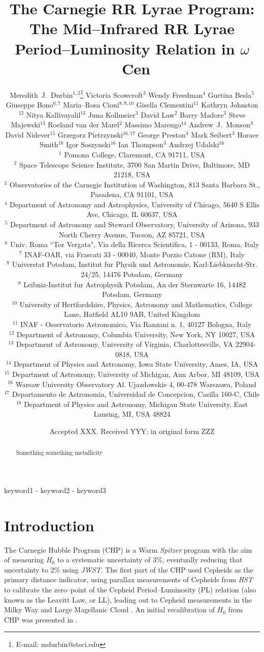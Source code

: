 \documentclass[a4paper,fleqn,usenatbib]{mnras}
\title[Mid--IR RR Lyrae PL Relation in $\omega$ Cen]{The Carnegie RR Lyrae Program: The Mid--Infrared RR Lyrae Period--Luminosity Relation in $\omega$~Cen}
\author[M.~J.~Durbin et al.]{Meredith~J.~Durbin$^{1,2}$\thanks{E-mail: mdurbin@stsci.edu}
Victoria Scowcroft$^{3}$
Wendy Freedman$^{4}$
Gurtina Besla$^{5}$ 
\newauthor Giuseppe Bono$^{6, 7}$
Maria--Rosa Cioni$^{8, 9, 10}$
Gisella Clementini$^{11}$
Kathryn Johnston$^{12}$
\newauthor Nitya Kallivayalil$^{13}$
Juna Kollmeier$^{3}$
David Law$^{2}$
Barry Madore$^{3}$
Steve Majewski$^{13}$
\newauthor Roeland van der Marel$^{2}$
Massimo Marengo$^{14}$
Andrew~J.~Monson$^{3}$
David Nidever$^{15}$ 
\newauthor
Grzegorz Pietrzynski$^{16, 17}$
George Preston$^{3}$
Mark Seibert$^{3}$
Horace Smith$^{18}$
\newauthor Igor Soszynski$^{16}$
Ian Thompson$^{3}$
Andrzej Udalski$^{16}$
\\
$^1$ Pomona College, Claremont, CA 91711, USA \\
$^2$ Space Telescope Science Institute, 3700 San Martin Drive, Baltimore, MD 21218, USA \\
$^3$ Observatories of the Carnegie Institution of Washington, 813 Santa Barbara St., Pasadena, CA 91101, USA \\
$^4$ Department of Astronomy and Astrophysics, University of Chicago, 5640 S Ellis Ave, Chicago, IL 60637, USA \\
$^5$ Department of Astronomy and Steward Observatory, University of Arizona, 933 North Cherry Avenue,   Tucson, AZ 85721, USA \\
$^6$ Univ. Roma ``Tor Vergata", Via della Ricerca Scientifica, 1 - 00133, Roma, Italy \\
$^7$ INAF-OAR, via Frascati 33 - 00040, Monte Porzio Catone (RM), Italy \\
$^8$ Universtat Potsdam, Institut fur Physik und Astronomie, Karl-Liebknecht-Str. 24/25, 14476 Potsdam, Germany \\
$^9$ Leibniz-Institut fur Astrophysik Potsdam, An der Sternwarte 16, 14482 Potsdam, Germany \\
$^{10}$ University of Hertfordshire, Physics, Astronomy and Mathematics, College Lane, Hatfield AL10 9AB, United Kingdom \\
$^{11}$ INAF - Osservatorio Astronomico, Via Ranzani n. 1, 40127 Bologna, Italy \\
$^{12}$ Department of Astronomy, Columbia University, New York, NY 10027, USA  \\
$^{13}$ Department of Astronomy, University of Virginia, Charlottesville, VA 22904-0818, USA \\
$^{14}$ Department of Physics and Astronomy, Iowa State University, Ames, IA, USA \\
$^{15}$ Department of Astronomy, University of Michigan, Ann Arbor, MI 48109, USA \\
$^{16}$ Warsaw University Observatory Al. Ujazdowskie 4, 00-478 Warszawa, Poland \\
$^{17}$ Departamento de Astronomia, Universidad de Concepcion, Casilla 160-C, Chile \\
$^{18}$ Department of Physics and Astronomy, Michigan State University, East Lansing, MI, USA 48824 \\
}
\date{Accepted XXX. Received YYY; in original form ZZZ}
\begin{document}
\label{firstpage}
\pagerange{\pageref{firstpage}-\pageref{lastpage}}
\maketitle

\begin{abstract}
Something something metallicity
\end{abstract}

\begin{keywords}
keyword1 - keyword2 - keyword3
\end{keywords}






\section{Introduction}
\label{sec:intro}
The Carnegie Hubble Program (CHP) is a Warm \textit{Spitzer} program with the aim of measuring $H_{0}$ to a systematic uncertainty of 3\%, eventually reducing that uncertainty to 2\% using \textit{JWST}. The first part of the CHP used Cepheids as the primary distance indicator, using parallax measurements of Cepheids from \textit{HST} \citep{2007AJ....133.1810B} to calibrate the zero--point of the Cepheid Period--Luminosity (PL) relation (also known as the Leavitt Law, or LL), leading out to Cepheid measurements in the Milky Way \citep[MW,][]{2012ApJ...759..146M} and Large Magellanic Cloud \citep[LMC,][]{2011ApJ...743...76S}. An initial recalibration of $H_{0}$ from CHP was presented in \citet{2012ApJ...758...24F}.
\end{document}
